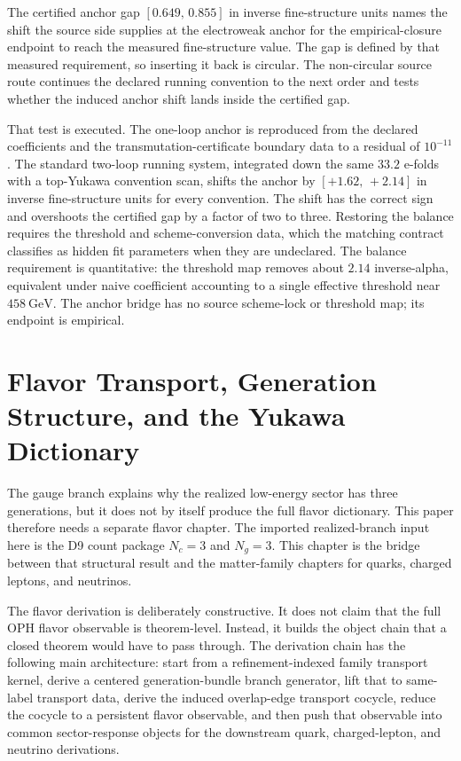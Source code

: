 \documentclass[11pt]{article}
\begin{document}
The certified anchor gap \([0.649,\,0.855]\) in inverse fine-structure units names the shift the
source side supplies at the electroweak anchor for the empirical-closure endpoint to reach the
measured fine-structure value. The gap is defined by that measured requirement, so inserting it
back is circular. The non-circular source route continues the declared running convention to the
next order and tests whether the induced anchor shift lands inside the certified gap.

That test is executed. The one-loop anchor is reproduced from the declared coefficients and the
transmutation-certificate boundary data to a residual of \(10^{-11}\). The standard two-loop
running system, integrated down the same \(33.2\) e-folds with a top-Yukawa convention scan, shifts
the anchor by \([+1.62,\,+2.14]\) in inverse fine-structure units for every convention. The shift
has the correct sign and overshoots the certified gap by a factor of two to three. Restoring the
balance requires the threshold and scheme-conversion data, which the matching contract classifies
as hidden fit parameters when they are undeclared. The balance requirement is quantitative: the
threshold map removes about \(2.14\) inverse-alpha, equivalent under naive coefficient accounting
to a single effective threshold near \(458~\mathrm{GeV}\). The anchor bridge has no source
scheme-lock or threshold map; its endpoint is empirical.

\section{Flavor Transport, Generation Structure, and the Yukawa Dictionary}

The gauge branch explains why the realized low-energy sector has three generations, but it does
not by itself produce the full flavor dictionary. This paper therefore needs a
separate flavor chapter. The imported realized-branch input here is the D9 count package
\(N_c=3\) and \(N_g=3\). This chapter is the bridge between that structural result and the
matter-family chapters for quarks, charged leptons, and neutrinos.

The flavor derivation is deliberately constructive. It does not claim that the full
OPH flavor observable is theorem-level. Instead, it builds the object chain that a
closed theorem would have to pass through. The derivation chain has the following main
architecture: start from a refinement-indexed family transport kernel, derive a centered
generation-bundle branch generator, lift that to same-label transport data, derive the induced
overlap-edge transport cocycle, reduce the cocycle to a persistent flavor observable, and then
push that observable into common sector-response objects for the downstream quark, charged-lepton,
and neutrino derivations.
\end{document}
